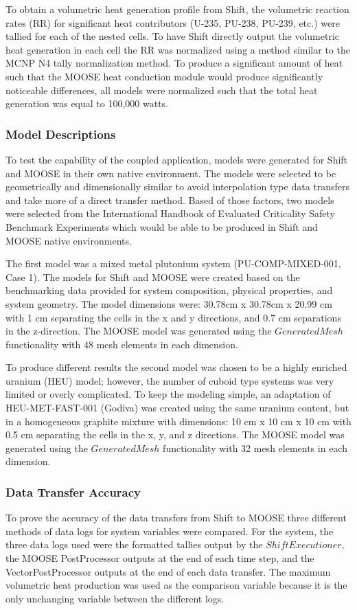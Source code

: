 \documentclass{anstrans}
\begin{document}
To obtain a volumetric heat generation profile from Shift, the volumetric reaction rates (RR) for significant heat contributors (U-235, PU-238, PU-239, etc.) were tallied for each of the nested cells. To have Shift directly output the volumetric heat generation in each cell the RR was normalized using a method similar to the MCNP N4 tally normalization method. To produce a significant amount of heat such that the MOOSE heat conduction module would produce significantly noticeable differences, all models were normalized such that the total heat generation was equal to 100,000 watts. 

\subsubsection{Model Descriptions}
To test the capability of the coupled application, models were generated for Shift and MOOSE in their own native environment. The models were selected to be geometrically and dimensionally similar to avoid interpolation type data transfers and take more of a direct transfer method. Based of those factors, two models were selected from the International Handbook of Evaluated Criticality Safety Benchmark Experiments \cite{CritHandbook} which would be able to be produced in Shift and MOOSE native environments. 

The first model was a mixed metal plutonium system (PU-COMP-MIXED-001, Case 1). The models for Shift and MOOSE were created based on the benchmarking data provided for system composition, physical properties, and system geometry. The model dimensions were: 30.78cm x 30.78cm x 20.99 cm with 1 cm separating the cells in the x and y directions, and 0.7 cm separations in the z-direction. The MOOSE model was generated using the $GeneratedMesh$ functionality with 48 mesh elements in each dimension. 

To produce different results the second model was chosen to be a highly enriched uranium (HEU) model; however, the number of cuboid type systems was very limited or overly complicated. To keep the modeling simple, an adaptation of HEU-MET-FAST-001 (Godiva) was created using the same uranium content, but in a homogeneous graphite mixture with dimensions: 10 cm x 10 cm x 10 cm with 0.5 cm separating the cells in the x, y, and z directions. The MOOSE model was generated using the $GeneratedMesh$ functionality with 32 mesh elements in each dimension. 

\subsubsection{Data Transfer Accuracy}
To prove the accuracy of the data transfers from Shift to MOOSE three different methods of data logs for system variables were compared. For the system, the three data logs used were the formatted tallies output by the $ShiftExecutioner$, the MOOSE PostProcessor outputs at the end of each time step, and the VectorPostProcessor outputs at the end of each data transfer. The maximum volumetric heat production was used as the comparison variable because it is the only unchanging variable between the different logs.
\end{document}
